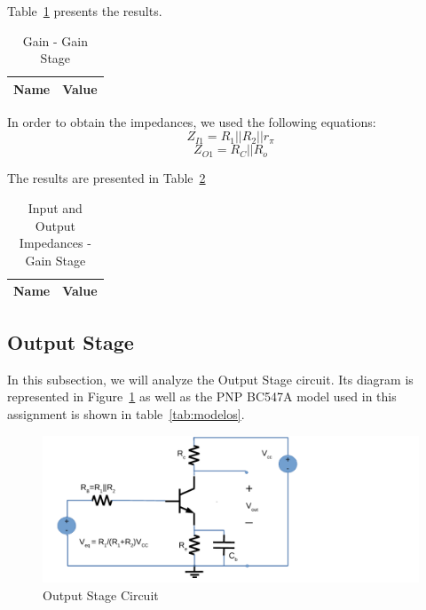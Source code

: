 Table~\ref{tab:avgs} presents the results.

\begin{table}[H]
  \centering
  \begin{tabular}{|l|r|}
     \hline    
    {\bf Name} & {\bf Value} \\ \hline   
    
  \end{tabular}
  \caption{Gain - Gain Stage}
  \label{tab:avgs}
\end{table}

In order to obtain the impedances, we used the following equations:
\begin{equation}
	Z_{I1}=R_1||R_2||r_\pi
\end{equation}
\begin{equation}
	Z_{O1}=R_C||R_o
\end{equation}

The results are presented in Table~\ref{tab:zgs}
\begin{table}[H]
  \centering
  \begin{tabular}{|l|r|}
     \hline    
    {\bf Name} & {\bf Value} \\ \hline   
    
  \end{tabular}
  \caption{Input and Output Impedances - Gain Stage}
  \label{tab:zgs}
\end{table}
\subsection{Output Stage}
In this subsection, we will analyze the Output Stage circuit. Its diagram is represented in Figure~\ref{fig:oscircuit} as well as the PNP BC547A model used in this assignment is shown in table~\ref{tab:modelos}.

\begin{figure}[H] \centering
\includegraphics[width=0.8\linewidth]{outstage.pdf}
\caption{Output Stage Circuit}                                     %
\label{fig:oscircuit}
\end{figure}

